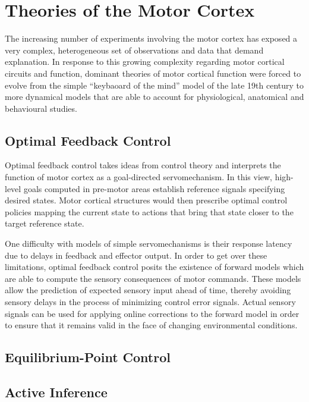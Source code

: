 \section{Theories of the Motor Cortex}

The increasing number of experiments involving the motor cortex has exposed a very complex, heterogeneous set of observations and data that demand explanation. In response to this growing complexity regarding motor cortical circuits and function, dominant theories of motor cortical function were forced to evolve from the simple ``keybaoard of the mind'' model of the late 19th century to more dynamical models that are able to account for physiological, anatomical and behavioural studies.

\subsection{Optimal Feedback Control}

Optimal feedback control takes ideas from control theory and interprets the function of motor cortex as a goal-directed servomechanism. In this view, high-level goals computed in pre-motor areas establish reference signals specifying desired states. Motor cortical structures would then prescribe optimal control policies mapping the current state to actions that bring that state closer to the target reference state.

One difficulty with models of simple servomechanisms is their response latency due to delays in feedback and effector output. In order to get over these limitations, optimal feedback control posits the existence of forward models which are able to compute the sensory consequences of motor commands. These models allow the prediction of expected sensory input ahead of time, thereby avoiding sensory delays in the process of minimizing control error signals. Actual sensory signals can be used for applying online corrections to the forward model in order to ensure that it remains valid in the face of changing environmental conditions.

\subsection{Equilibrium-Point Control}



\subsection{Active Inference}

